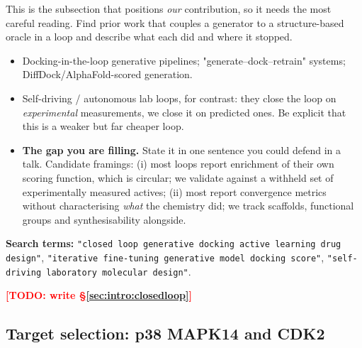 \documentclass[11pt]{article}
\newcommand{\TODO}[1]{\textcolor{red}{\textbf{[TODO: #1]}}}
\begin{document}
\begin{yourturn}
This is the subsection that positions \emph{our} contribution, so it needs the
most careful reading. Find prior work that couples a generator to a
structure-based oracle in a loop and describe what each did and where it stopped.
\begin{itemize}\itemsep0pt
  \item Docking-in-the-loop generative pipelines; "generate--dock--retrain"
        systems; DiffDock/AlphaFold-scored generation.
  \item Self-driving / autonomous lab loops, for contrast: they close the loop
        on \emph{experimental} measurements, we close it on predicted ones.
        Be explicit that this is a weaker but far cheaper loop.
  \item \textbf{The gap you are filling.} State it in one sentence you could
        defend in a talk. Candidate framings: (i) most loops report enrichment
        of their own scoring function, which is circular; we validate against a
        withheld set of experimentally measured actives; (ii) most report
        convergence metrics without characterising \emph{what} the chemistry
        did; we track scaffolds, functional groups and synthesisability
        alongside.
\end{itemize}
\textbf{Search terms:} \texttt{"closed loop generative docking active learning
drug design"}, \texttt{"iterative fine-tuning generative model docking score"},
\texttt{"self-driving laboratory molecular design"}.
\end{yourturn}

\TODO{write \S\ref{sec:intro:closedloop}}

\subsection{Target selection: p38 MAPK14 and CDK2}
\label{sec:intro:targets}
\end{document}
